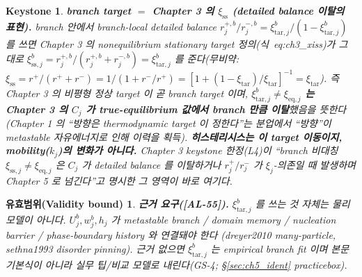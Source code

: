\documentclass[11pt,a4paper]{article}
\newtheorem*{boundbox}{유효범위(Validity bound)}
\newtheorem*{keybox}{Keystone}
\newcommand{\eq}{\mathrm{eq}}
\newcommand{\tar}{\mathrm{tar}}
\newcommand{\sstat}{\mathrm{ss}}
\newcommand{\AL}[1]{\textsf{[AL-#1]}}
\begin{document}
\begin{keybox}
\textbf{branch target $=$ Chapter 3 의 $\xi_{\sstat}$ (detailed balance 이탈의 표현).} branch 안에서
branch-local detailed balance $r_j^{+,b}/r_j^{-,b}=\xi_{\tar,j}^b/(1-\xi_{\tar,j}^b)$ 를 쓰면 Chapter 3 의
nonequilibrium stationary target 정의(식~eq:ch3\_xiss)가 그대로
$\xi_{\sstat,j}^b=r_j^{+,b}/(r_j^{+,b}+r_j^{-,b})=\xi_{\tar,j}^b$ 를 준다(무비약: $\xi_{\sstat}=r^+/(r^++r^-)
=1/(1+r^-/r^+)=[1+(1-\xi_\tar)/\xi_\tar]^{-1}=\xi_\tar$). 즉 \emph{Chapter 3 의 비평형 정상 target 이 곧
branch target} 이며, \textbf{$\xi_{\tar,j}^b\ne\xi_{\eq,j}$ 는 Chapter 3 의 $C_j$ 가 true-equilibrium
값에서 branch 만큼 \emph{이탈}}했음을 뜻한다(Chapter 1 의 ``방향은 thermodynamic target 이 정한다''는 분업에서
``방향''이 metastable 자유에너지로 인해 이력을
획득). \textbf{히스테리시스는 이 \emph{target 이동}이지, mobility($k_j$)의 변화가 아니다.} Chapter 3 keystone
한정(L4)이 ``branch 비대칭 $\xi_{\sstat,j}\ne\xi_{\eq,j}$ 은 $C_j$ 가 detailed balance 를 이탈하거나
$r_j^+/r_j^-$ 가 $\xi_j$-의존일 때 발생하며 Chapter 5 로 넘긴다''고 명시한 그 영역이 바로 여기다.
\end{keybox}
\begin{boundbox}
\textbf{근거 요구(\AL{55}).} $\xi_{\tar,j}^b$ 를 쓰는 것 자체는 물리 모델이 아니다. $U_j^b,w_j^b,h_j$ 가
metastable branch / domain memory / nucleation barrier / phase-boundary history 와 연결돼야 한다
(dreyer2010 many-particle, sethna1993 disorder pinning). 근거 없으면 $\xi_{\tar,j}^b$ 는 empirical branch
fit 이며 본문 기본식이 아니라 실무 팁/비교 모델로 내린다(GS-4; \S\ref{sec:ch5_ident} practicebox).
\end{boundbox}
\end{document}
